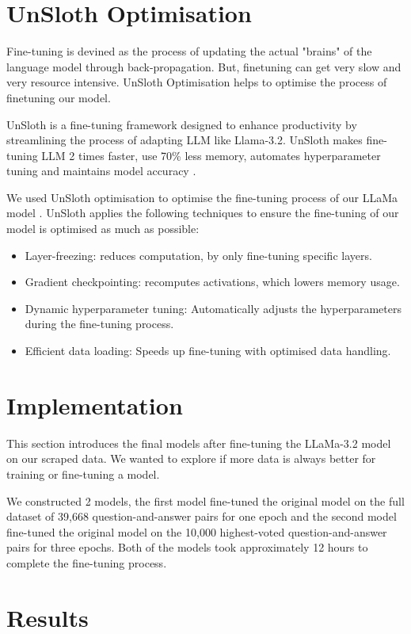 \documentclass[10pt]{article}
\begin{document}
\section{UnSloth Optimisation}

Fine-tuning is devined as the process of updating the actual "brains" of the language model
through back-propagation. But, finetuning can get very slow and very resource intensive.
UnSloth Optimisation helps to optimise the process of finetuning our model.

UnSloth is a fine-tuning framework designed to enhance productivity by streamlining the
process of adapting LLM like Llama-3.2. UnSloth makes fine-tuning
LLM 2 times faster, use 70\% less memory, automates hyperparameter tuning
and maintains model accuracy \cite{unslothdocs}.

We used UnSloth optimisation to optimise the fine-tuning process of our LLaMa model \cite{unslothfine-tune}.
UnSloth applies the following techniques to ensure the fine-tuning
of our model is optimised as much as possible:
\begin{itemize}
    \item Layer-freezing: reduces computation, by only fine-tuning specific layers.
    \item Gradient checkpointing: recomputes activations, which lowers memory usage.
    \item Dynamic hyperparameter tuning: Automatically adjusts the hyperparameters during the fine-tuning process.
    \item Efficient data loading: Speeds up fine-tuning with optimised data handling.
\end{itemize}

\section{Implementation}

This section introduces the final models after fine-tuning the LLaMa-3.2 model on our scraped data.
We wanted to explore if more data is always better for training or fine-tuning a model.

We constructed 2 models, the first model fine-tuned the original model on the full dataset of
39,668 question-and-answer pairs for one epoch and the second model fine-tuned the original model
on the 10,000 highest-voted question-and-answer pairs for three epochs. Both of the models took
approximately 12 hours to complete the fine-tuning process.

\section{Results}
\end{document}
